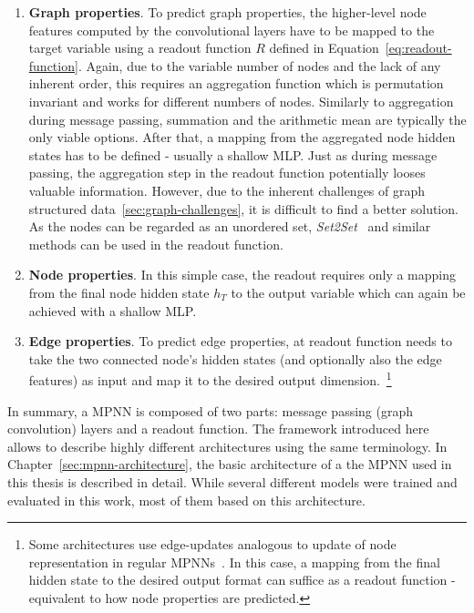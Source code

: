 \begin{enumerate}
	\item \textbf{Graph properties}. To predict graph properties, the higher-level node features computed by the convolutional layers have to be mapped to the target variable using a readout function $R$ defined in Equation~\ref{eq:readout-function}. Again, due to the variable number of nodes and the lack of any inherent order, this requires an aggregation function which is permutation invariant and works for different numbers of nodes. Similarly to aggregation during message passing, summation and the arithmetic mean are typically the only viable options. After that, a mapping from the aggregated node hidden states has to be defined - usually a shallow MLP.
	Just as during message passing, the aggregation step in the readout function potentially looses valuable information. However, due to the inherent challenges of graph structured data~\ref{sec:graph-challenges}, it is difficult to find a better solution. As the nodes can be regarded as an unordered set, \textit{Set2Set}~\cite{Vinyals2015} and similar methods can be used in the readout function.
	\item \textbf{Node properties}. In this simple case, the readout requires only a mapping from the final node hidden state $h_T$ to the output variable which can again be achieved with a shallow MLP.
	\item \textbf{Edge properties}. To predict edge properties, at readout function needs to take the two connected node's hidden states (and optionally also the edge features) as input and map it to the desired output dimension.~\footnote{Some architectures use edge-updates analogous to update of node representation in regular MPNNs~\cite{Jørgensen2018}. In this case, a mapping from the final hidden state to the desired output format can suffice as a readout function - equivalent to how node properties are predicted.}
\end{enumerate}


In summary, a MPNN is composed of two parts: message passing (graph convolution) layers and a readout function. The framework introduced here allows to describe highly different architectures using the same terminology. In Chapter~\ref{sec:mpnn-architecture}, the basic architecture of a the MPNN used in this thesis is described in detail. While several different models were trained and evaluated in this work, most of them based on this architecture.



